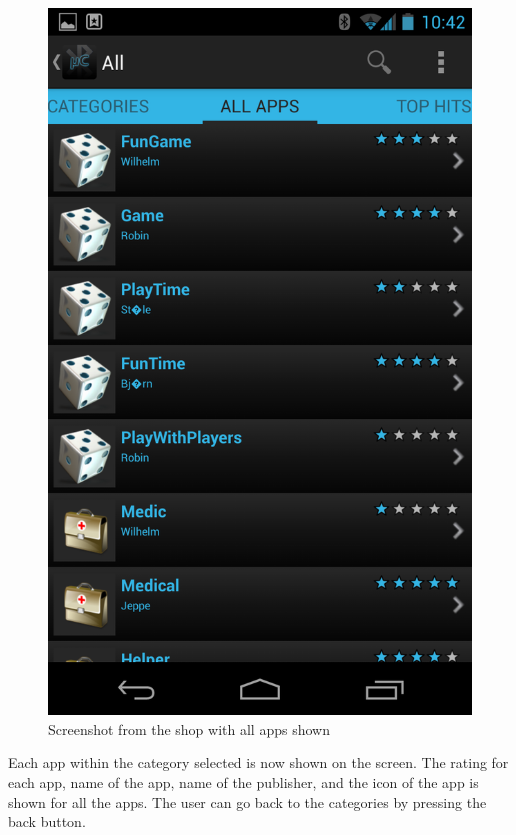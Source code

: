 \newline
\begin{figure}[H]
	\centering
	\includegraphics[scale = 0.3]{images/Screenshots/all_apps.png}
	\caption{Screenshot from the shop with all apps shown}
\end{figure}

Each app within the category selected is now shown on the screen. The rating for each app, name of the app, name of the publisher, and the icon of the app is shown for all the apps. The user can go back to the categories by pressing the back button. \\

